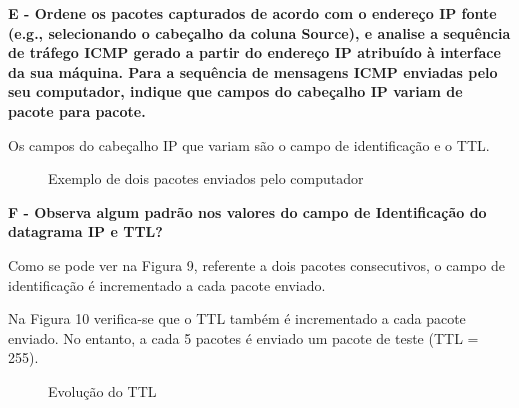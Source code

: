\documentclass[11pt]{article}
\begin{document}
\clearpage

\textbf{E -  Ordene os pacotes capturados de acordo com o endereço IP fonte (e.g., selecionando o cabeçalho da coluna Source), e analise a sequência de tráfego ICMP gerado a partir do endereço IP atribuído à interface da sua máquina. Para a sequência de mensagens ICMP enviadas pelo seu computador, indique que campos do cabeçalho IP variam de pacote para pacote.}

Os campos do cabeçalho IP que variam são o campo de identificação e o TTL.

\begin{figure}[hbt!]
    \minipage{\textwidth}
        \centering
    \endminipage\hfill
    \vspace{0.3cm}
    \minipage{\textwidth}
        \centering
    \endminipage
    \caption{Exemplo de dois pacotes enviados pelo computador}
\end{figure}

\vspace{0.5cm}

\textbf{F - Observa algum padrão nos valores do campo de Identificação do datagrama IP e TTL?}

Como se pode ver na Figura 9, referente a dois pacotes consecutivos, o campo de identificação é incrementado a cada pacote enviado.

Na Figura 10 verifica-se que o TTL também é incrementado a cada pacote enviado. No entanto, a cada 5 pacotes é enviado um pacote de teste (TTL = 255).

\begin{figure}[hbt!]
    \centering
    \caption{Evolução do TTL}
\end{figure}
\end{document}
